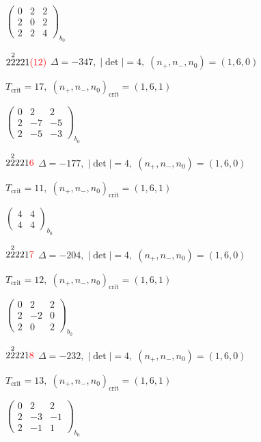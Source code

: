 \documentclass[10pt]{article}
\begin{document}
\hspace{2em}$\left(\begin{smallmatrix}0 & 2 & 2 \\ 2 & 0 & 2 \\ 2 & 2 & 4\end{smallmatrix}\right)_{\!b_0}$

$2\overset{2}{2}221\textcolor{red}{(12)}$ \quad $\Delta=-347,\; |\det|=4,\; (n_+,n_-,n_0)=(1,6,0)$

\hspace{1em}$T_{\text{crit}}=17,\; (n_+,n_-,n_0)_{\text{crit}}=(1,6,1)$

\hspace{2em}$\left(\begin{smallmatrix}0 & 2 & 2 \\ 2 & -7 & -5 \\ 2 & -5 & -3\end{smallmatrix}\right)_{\!b_0}$

$2\overset{2}{2}221\textcolor{red}{6}$ \quad $\Delta=-177,\; |\det|=4,\; (n_+,n_-,n_0)=(1,6,0)$

\hspace{1em}$T_{\text{crit}}=11,\; (n_+,n_-,n_0)_{\text{crit}}=(1,6,1)$

\hspace{2em}$\left(\begin{smallmatrix}4 & 4 \\ 4 & 4\end{smallmatrix}\right)_{\!b_0}$

$2\overset{2}{2}221\textcolor{red}{7}$ \quad $\Delta=-204,\; |\det|=4,\; (n_+,n_-,n_0)=(1,6,0)$

\hspace{1em}$T_{\text{crit}}=12,\; (n_+,n_-,n_0)_{\text{crit}}=(1,6,1)$

\hspace{2em}$\left(\begin{smallmatrix}0 & 2 & 2 \\ 2 & -2 & 0 \\ 2 & 0 & 2\end{smallmatrix}\right)_{\!b_0}$

$2\overset{2}{2}221\textcolor{red}{8}$ \quad $\Delta=-232,\; |\det|=4,\; (n_+,n_-,n_0)=(1,6,0)$

\hspace{1em}$T_{\text{crit}}=13,\; (n_+,n_-,n_0)_{\text{crit}}=(1,6,1)$

\hspace{2em}$\left(\begin{smallmatrix}0 & 2 & 2 \\ 2 & -3 & -1 \\ 2 & -1 & 1\end{smallmatrix}\right)_{\!b_0}$
\end{document}

